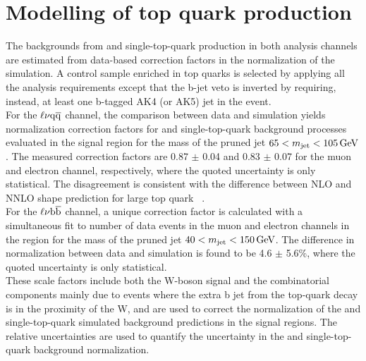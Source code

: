 \section{Modelling of top quark production}\label{sec:ttbar}

The backgrounds from \ttbar and single-top-quark production in both analysis channels are estimated from data-based correction factors in the normalization of the simulation.
A control sample enriched in top quarks is selected by applying all the analysis requirements except that the b-jet veto is inverted by requiring, instead, at least one b-tagged AK4 (or AK5) jet in the event.\\

For the $\ell\nu\mathrm{q}\overline{\mathrm{q}}$ channel, the comparison between data and simulation yields normalization correction factors for \ttbar and single-top-quark background processes evaluated in the signal region for the mass of the pruned jet
$65 < m_{\text{jet}} < 105\,\text{Ge\hspace{-.08em}V}$. The measured correction factors are 0.87 $\pm$ 0.04 and 0.83 $\pm$ 0.07 for the muon and electron channel, respectively, where the quoted uncertainty is only statistical.
The disagreement is consistent with the difference between NLO and NNLO shape prediction for large top quark \pt~\cite{Czakon:2015owf}.\\

For the $\ell\nu{\mathrm{b}\overline{\mathrm{b}}}$ channel, a unique correction factor is calculated with a simultaneous fit to number of data events in the muon and electron channels in the region for the mass of the pruned jet $40 < m_{\text{jet}} < 150\,\text{Ge\hspace{-.08em}V}$.
The difference in normalization between data and simulation is found to be 4.6 $\pm$ 5.6\%, where the quoted uncertainty is only statistical. \\

These scale factors include both the W-boson signal and the combinatorial components mainly due to events where the extra b jet from the top-quark decay is in the proximity of the W, and are used to correct the normalization
of the \ttbar and single-top-quark simulated background predictions in the signal regions. The relative uncertainties are used to quantify the uncertainty in the \ttbar and single-top-quark background normalization.

